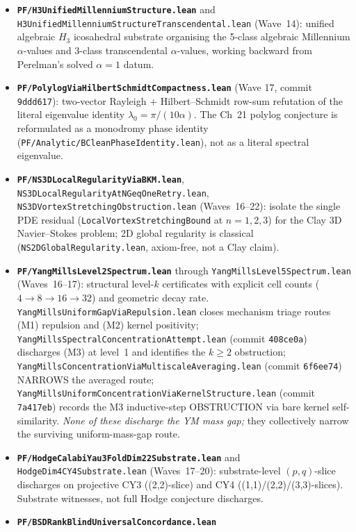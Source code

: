 \begin{itemize}
\item \textbf{\texttt{PF/H3UnifiedMillenniumStructure.lean}} and
  \texttt{H3UnifiedMillenniumStructureTranscendental.lean}
  (Wave~14): unified algebraic $H_3$ icosahedral substrate
  organising the 5-class algebraic Millennium $\alpha$-values and
  3-class transcendental $\alpha$-values, working backward from
  Perelman's solved $\alpha = 1$ datum.
\item \textbf{\texttt{PF/PolylogViaHilbertSchmidtCompactness.lean}}
  (Wave 17, commit \texttt{9ddd617}): two-vector Rayleigh +
  Hilbert--Schmidt row-sum refutation of the literal eigenvalue
  identity $\lambda_0 = \pi/(10\alpha)$. The Ch~21 polylog conjecture
  is reformulated as a monodromy phase identity
  (\texttt{PF/Analytic/BCleanPhaseIdentity.lean}), not as a literal
  spectral eigenvalue.
\item \textbf{\texttt{PF/NS3DLocalRegularityViaBKM.lean}},
  \texttt{NS3DLocalRegularityAtNGeqOneRetry.lean},
  \texttt{NS3DVortexStretchingObstruction.lean} (Waves~16--22):
  isolate the single PDE residual
  (\texttt{LocalVortexStretchingBound} at $n=1,2,3$) for the Clay
  3D Navier--Stokes problem; 2D global regularity is classical
  (\texttt{NS2DGlobalRegularity.lean}, axiom-free, not a Clay claim).
\item \textbf{\texttt{PF/YangMillsLevel2Spectrum.lean}} through
  \texttt{YangMillsLevel5Spectrum.lean} (Waves~16--17):
  structural level-$k$ certificates with explicit cell counts
  ($4 \to 8 \to 16 \to 32$) and geometric decay rate.
  \texttt{YangMillsUniformGapViaRepulsion.lean} closes mechanism
  triage routes (M1) repulsion and (M2) kernel positivity;
  \texttt{YangMillsSpectralConcentrationAttempt.lean} (commit
  \texttt{408ce0a}) discharges (M3) at level~1 and identifies the
  $k \geq 2$ obstruction;
  \texttt{YangMillsConcentrationViaMultiscaleAveraging.lean} (commit
  \texttt{6f6ee74}) NARROWS the averaged route;
  \texttt{YangMillsUniformConcentrationViaKernelStructure.lean}
  (commit \texttt{7a417eb}) records the M3 inductive-step
  OBSTRUCTION via bare kernel self-similarity. \emph{None of these
  discharge the YM mass gap;} they collectively narrow the surviving
  uniform-mass-gap route.
\item \textbf{\texttt{PF/HodgeCalabiYau3FoldDim22Substrate.lean}}
  and \texttt{HodgeDim4CY4Substrate.lean} (Waves~17--20):
  substrate-level $(p,q)$-slice discharges on projective CY3
  ((2,2)-slice) and CY4 ((1,1)/(2,2)/(3,3)-slices). Substrate
  witnesses, not full Hodge conjecture discharges.
\item \textbf{\texttt{PF/BSDRankBlindUniversalConcordance.lean}}

\end{itemize}
